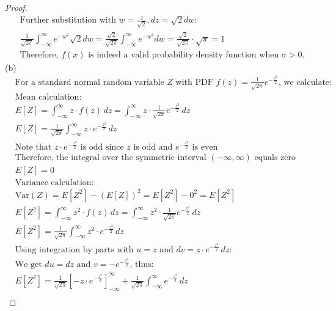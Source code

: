 \documentclass[letterpaper, 11pt]{article}
\newcommand{\1}{\mathds{1}}	%
\theoremstyle{definition}
\begin{document}
\begin{proof}
\begin{align*}
            &\text{Further substitution with } w = \frac{z}{\sqrt{2}}, dz = \sqrt{2}dw:\\
            &\frac{1}{\sqrt{2\pi}} \int_{-\infty}^{\infty} e^{-w^2} \sqrt{2}dw = \frac{\sqrt{2}}{\sqrt{2\pi}} \int_{-\infty}^{\infty} e^{-w^2} dw = \frac{\sqrt{2}}{\sqrt{2\pi}} \cdot \sqrt{\pi} = 1\\
            &\text{Therefore, } f(x) \text{ is indeed a valid probability density function when } \sigma > 0.
            \end{align*}
            (b)
            \begin{align*}
                &\text{For a standard normal random variable $Z$ with PDF $f(z) = \frac{1}{\sqrt{2\pi}}e^{-\frac{z^2}{2}}$, we calculate:}\\
                &\text{Mean calculation:}\\
                &E[Z] = \int_{-\infty}^{\infty} z \cdot f(z) \, dz = \int_{-\infty}^{\infty} z \cdot \frac{1}{\sqrt{2\pi}}e^{-\frac{z^2}{2}} \, dz\\
                &E[Z] = \frac{1}{\sqrt{2\pi}} \int_{-\infty}^{\infty} z \cdot e^{-\frac{z^2}{2}} \, dz\\
                &\text{Note that $z \cdot e^{-\frac{z^2}{2}}$ is odd since $z$ is odd and $e^{-\frac{z^2}{2}}$ is even}\\
                &\text{Therefore, the integral over the symmetric interval $(-\infty, \infty)$ equals zero}\\
                &E[Z] = 0\\
                &\text{Variance calculation:}\\
                &\text{Var}(Z) = E[Z^2] - (E[Z])^2 = E[Z^2] - 0^2 = E[Z^2]\\
                &E[Z^2] = \int_{-\infty}^{\infty} z^2 \cdot f(z) \, dz = \int_{-\infty}^{\infty} z^2 \cdot \frac{1}{\sqrt{2\pi}}e^{-\frac{z^2}{2}} \, dz\\
                &E[Z^2] = \frac{1}{\sqrt{2\pi}} \int_{-\infty}^{\infty} z^2 \cdot e^{-\frac{z^2}{2}} \, dz\\
                &\text{Using integration by parts with $u = z$ and $dv = z \cdot e^{-\frac{z^2}{2}} \, dz$:}\\
                &\text{We get $du = dz$ and $v = -e^{-\frac{z^2}{2}}$, thus:}\\
                &E[Z^2] = \frac{1}{\sqrt{2\pi}} \left[ -z \cdot e^{-\frac{z^2}{2}} \right]_{-\infty}^{\infty} + \frac{1}{\sqrt{2\pi}} \int_{-\infty}^{\infty} e^{-\frac{z^2}{2}} \, dz\\

\end{align*}
\end{proof}
\end{document}
